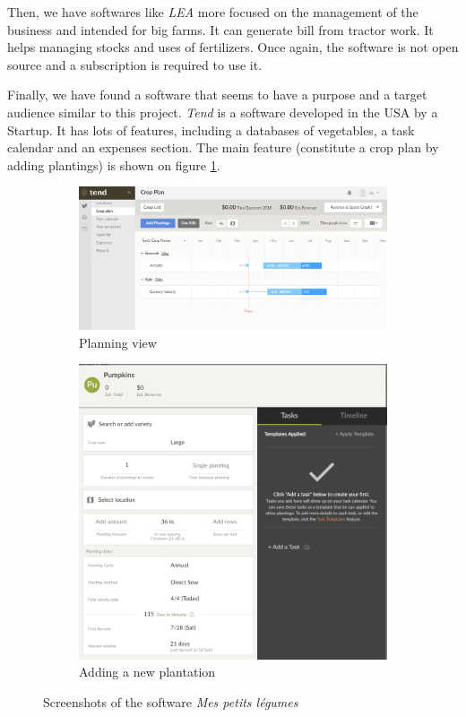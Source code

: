 Then, we have softwares like \emph{LEA}\cite{lea-agri} more focused on the management of the business and intended for big farms. It can generate bill from tractor work. It helps managing stocks and uses of fertilizers. 
Once again, the software is not open source and a subscription is required to use it.

Finally, we have found a software that seems to have a purpose and a target audience similar to this project. \emph{Tend}\cite{tend} is a software developed in the USA by a Startup. It has lots of features, including a databases of vegetables, a task calendar and an expenses section. The main feature (constitute a crop plan by adding plantings) is shown on figure \ref{fig:tend}.

\begin{figure}
\centering
\begin{subfigure}{.5\textwidth}
  \centering
  \includegraphics[width=0.9\linewidth]{images/tend1.PNG}
  \caption{Planning view}
\end{subfigure}%
\begin{subfigure}{.5\textwidth}
  \centering
  \includegraphics[width=0.7\linewidth]{images/tend2.PNG}
  \caption{Adding a new plantation}
\end{subfigure}
\caption{Screenshots of the software \emph{Mes petits légumes}}
\label{fig:tend}
\end{figure}

